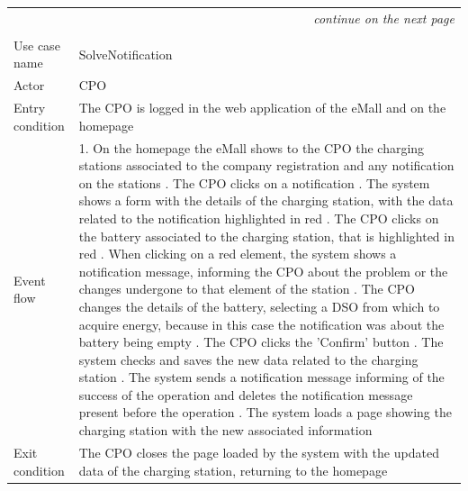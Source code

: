 \begin{center}
    \begin{longtable}{p{4cm} p{11cm}}
    \multicolumn{2}{r}{\itshape{continue on the next page}}\\
    \endfoot 
    \\
    \endlastfoot
    \hline
     Use case name &  SolveNotification\\ %
     \hline
     Actor & CPO \\
     \hline
     Entry condition & The CPO is logged in the web application of the eMall and on the homepage \\
     \hline
     Event flow &   1. On the homepage the eMall shows to the CPO the charging stations associated to the company                   registration and any notification on the stations \newline
                    2. The CPO clicks on a notification \newline 
                    3. The system shows a form with the details of the charging station, with the data related to the notification highlighted in red  \newline
                    4. The CPO clicks on the battery associated to the charging station, that is highlighted in red \newline
                    5. When clicking on a red element, the system shows a notification message, informing the CPO about the problem or the changes undergone to that element of the station \newline
                    6. The CPO changes the details of the battery, selecting a DSO from which to acquire energy, because in this case the notification was about the battery being empty \newline
                    7. The CPO clicks the 'Confirm' button \newline
                    8. The system checks and saves the new data related to the charging station \newline
                    9. The system sends a notification message informing of the success of the operation and deletes the notification message present before the operation \newline
                    10. The system loads a page showing the charging station with the new associated information\\
     \hline
     Exit condition &  The CPO closes the page loaded by the system with the updated data of the charging station, returning to the homepage \\

\end{longtable}
\end{center}

